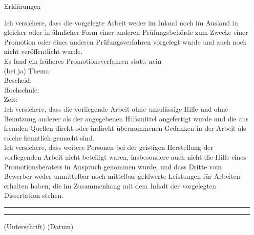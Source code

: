\documentclass[11pt]{book}
\begin{document}
\thispagestyle{empty}
\textnormal{\large Erklärungen}\\
\vspace*{\fill}

\begingroup

\textnormal{Ich versichere, dass die vorgelegte Arbeit weder im Inland noch im Ausland in gleicher oder in ähnlicher
Form einer anderen Prüfungsbehörde zum Zwecke einer Promotion oder eines anderen Prüfungsverfahren
vorgelegt wurde und auch noch nicht veröffentlicht wurde.}\\[1em]
\textnormal{Es fand ein früheres Promotionsverfahren statt: nein}\\ 
\textnormal{(bei ja) Thema:}\\
\textnormal{Bescheid:}\\
\textnormal{Hochschule:}\\
\textnormal{Zeit:}\\[1em]

\textnormal{Ich versichere, dass die vorliegende Arbeit ohne unzulässige Hilfe und ohne Benutzung anderer als der
angegebenen Hilfsmittel angefertigt wurde und die aus fremden Quellen direkt oder indirekt
übernommenen Gedanken in der Arbeit als solche kenntlich gemacht sind.}\\[1em]
\textnormal{Ich versichere, dass weitere Personen bei der geistigen Herstellung der vorliegenden Arbeit nicht beteiligt
waren, insbesondere auch nicht die Hilfe eines Promotionsberaters in Anspruch genommen wurde, und
dass Dritte vom Bewerber weder unmittelbar noch mittelbar geldwerte Leistungen für Arbeiten erhalten
haben, die im Zusammenhang mit dem Inhalt der vorgelegten Dissertation stehen.}\\


\centering

\hspace{3em}



\vspace{8em}

\rule[1em]{10em}{0.5pt} %
\hspace*{\fill}
\rule[1em]{10em}{0.5pt}

\textnormal{(Unterschrift) \hspace*{\fill} (Datum)}
 



\endgroup
\vspace*{\fill}


\end{document}
